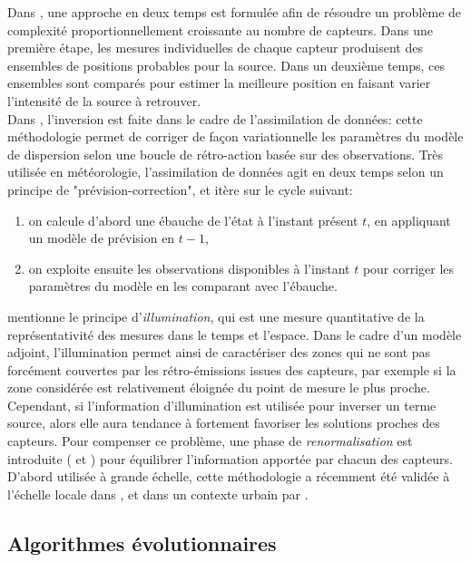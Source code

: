 Dans \cite{Matthes2005}, une approche en deux temps est formulée afin de résoudre un problème de complexité proportionnellement croissante au nombre de capteurs. Dans une première étape, les mesures individuelles de chaque capteur produisent des ensembles de positions probables pour la source. Dans un deuxième temps, ces ensembles sont comparés pour estimer la meilleure position en faisant varier l'intensité de la source à retrouver. \\

 Dans \cite{Robertson1998}, l'inversion est faite dans le cadre de l'assimilation de données: cette méthodologie permet de corriger de façon variationnelle les paramètres du modèle de dispersion selon une boucle de rétro-action basée sur des observations. Très utilisée en météorologie, l'assimilation de données agit en deux temps selon un principe de "prévision-correction", et itère sur le cycle suivant:
 \begin{enumerate}
 	\item  on calcule d'abord une ébauche de l'état à l'instant présent $t$, en appliquant un modèle de prévision en $t-1$,
 	\item  on exploite ensuite les observations disponibles à l'instant $t$ pour corriger les paramètres du modèle en les comparant avec l'ébauche. \\
 \end{enumerate}
 
 \cite{Issartel2005} mentionne le principe d'\textit{illumination}, qui est une mesure quantitative de la représentativité des mesures dans le temps et l'espace. Dans le cadre d'un modèle adjoint, l'illumination permet ainsi de caractériser des zones qui ne sont pas forcément couvertes par les rétro-émissions issues des capteurs, par exemple si la zone considérée est relativement éloignée du point de mesure le plus proche. Cependant, si l'information d'illumination est utilisée pour inverser un terme source, alors elle aura tendance à fortement favoriser les solutions proches des capteurs. Pour compenser ce problème, une phase de \textit{renormalisation} est introduite (\cite{Issartel2007} et \cite{Sharan2009}) pour équilibrer l'information apportée par chacun des capteurs. D'abord utilisée à grande échelle, cette méthodologie a récemment été validée à l'échelle locale dans \cite{Singh2014}, et dans un contexte urbain par \cite{Kumar2015}. \\
 
 
 \subsection{Algorithmes évolutionnaires}
 
